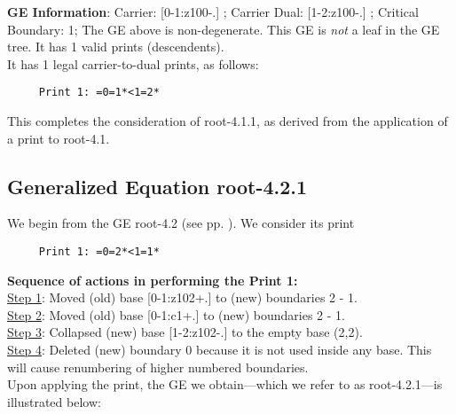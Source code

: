 \documentclass[final]{article}
\begin{document}
{\bf GE Information}:  
Carrier: [0-1:z100-.] ;  
Carrier Dual: [1-2:z100-.] ;  
Critical Boundary: 1;  
The GE above is non-degenerate.  This GE is {\em not} a leaf in the GE tree.   It has 1 valid prints (descendents).  \\[0.1in]
   It has 1 legal carrier-to-dual prints, as follows:
\begin{verbatim}
     Print 1: =0=1*<1=2*
\end{verbatim}
This completes the consideration of root-4.1.1, as derived from the application of a print to root-4.1.\\[0.1in]
\subsection*{Generalized Equation root-4.2.1}
\label{root-4.2.1}We begin from the GE root-4.2 (see pp. \pageref{root-4.2}).  {We consider its print}
\begin{verbatim}
     Print 1: =0=2*<1=1*
\end{verbatim}
{\bf Sequence of actions in performing the Print 1:}\\
{\underline{Step 1}:} Moved (old) base [0-1:z102+.]  to (new) boundaries 2 - 1.\\
{\underline{Step 2}:} Moved (old) base [0-1:c1+.]  to (new) boundaries 2 - 1.\\
{\underline{Step 3}:} Collapsed (new) base [1-2:z102-.]  to the empty base (2,2).
\\
{\underline{Step 4}:} Deleted (new) boundary 0 because it is not used inside any base.  This will cause renumbering of higher numbered boundaries.
\\[0.1in]
{Upon applying the print, the GE we obtain---which we refer to as root-4.2.1---is illustrated below:}
\end{document}
